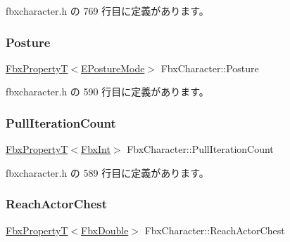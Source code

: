  fbxcharacter.\+h の 769 行目に定義があります。

\mbox{\label{class_fbx_character_ae4d654dc816661a08bc56afe92777619}} 
\subsubsection{\texorpdfstring{Posture}{Posture}}
{\footnotesize\ttfamily \hyperlink{class_fbx_property_t}{Fbx\+PropertyT}$<$\hyperlink{class_fbx_character_a75545d98d73cc8dd7c1bf491bf004113}{E\+Posture\+Mode}$>$ Fbx\+Character\+::\+Posture}



 fbxcharacter.\+h の 590 行目に定義があります。

\mbox{\label{class_fbx_character_aa9fba8bc68ce346b97a22553e84635b0}} 
\subsubsection{\texorpdfstring{Pull\+Iteration\+Count}{PullIterationCount}}
{\footnotesize\ttfamily \hyperlink{class_fbx_property_t}{Fbx\+PropertyT}$<$\hyperlink{fbxtypes_8h_a088fa96de3b0b3ea69f0f6afef525dfb}{Fbx\+Int}$>$ Fbx\+Character\+::\+Pull\+Iteration\+Count}



 fbxcharacter.\+h の 589 行目に定義があります。

\mbox{\label{class_fbx_character_ad89af6652b384959dbd29e34290bb3fd}} 
\subsubsection{\texorpdfstring{Reach\+Actor\+Chest}{ReachActorChest}}
{\footnotesize\ttfamily \hyperlink{class_fbx_property_t}{Fbx\+PropertyT}$<$\hyperlink{fbxtypes_8h_a171e72a1c46fc15c1a6c9c31948c1c5b}{Fbx\+Double}$>$ Fbx\+Character\+::\+Reach\+Actor\+Chest}



